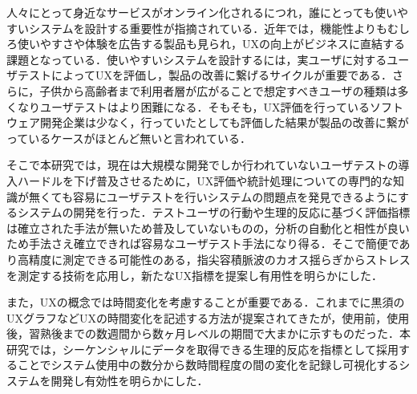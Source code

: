 


\begin{jabstract}

人々にとって身近なサービスがオンライン化されるにつれ，誰にとっても使いやすいシステムを設計する重要性が指摘されている．近年では，機能性よりもむしろ使いやすさや体験を広告する製品も見られ，UXの向上がビジネスに直結する課題となっている．使いやすいシステムを設計するには，実ユーザに対するユーザテストによってUXを評価し，製品の改善に繋げるサイクルが重要である．さらに，子供から高齢者まで利用者層が広がることで想定すべきユーザの種類は多くなりユーザテストはより困難になる．そもそも，UX評価を行っているソフトウェア開発企業は少なく，行っていたとしても評価した結果が製品の改善に繋がっているケースがほとんど無いと言われている．

そこで本研究では，現在は大規模な開発でしか行われていないユーザテストの導入ハードルを下げ普及させるために，UX評価や統計処理についての専門的な知識が無くても容易にユーザテストを行いシステムの問題点を発見できるようにするシステムの開発を行った．テストユーザの行動や生理的反応に基づく評価指標は確立された手法が無いため普及していないものの，分析の自動化と相性が良いため手法さえ確立できれば容易なユーザテスト手法になり得る．そこで簡便であり高精度に測定できる可能性のある，指尖容積脈波のカオス揺らぎからストレスを測定する技術を応用し，新たなUX指標を提案し有用性を明らかにした．

また，UXの概念では時間変化を考慮することが重要である．これまでに黒須のUXグラフなどUXの時間変化を記述する方法が提案されてきたが，使用前，使用後，習熟後までの数週間から数ヶ月レベルの期間で大まかに示すものだった．本研究では，シーケンシャルにデータを取得できる生理的反応を指標として採用することでシステム使用中の数分から数時間程度の間の変化を記録し可視化するシステムを開発し有効性を明らかにした．

\end{jabstract}



